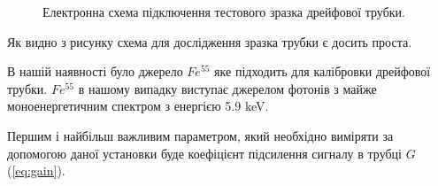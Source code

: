 \documentclass[pdftex,14pt]{scrartcl}
\begin{document}
\begin{spacing}{1.5}
\begin{figure}[!h]
	\caption{Електронна схема підключення тестового зразка дрейфової трубки.}
	\label{fig:electricCircuit}	
	\end{figure}
	
	
	
	
	
	
	
	Як видно з рисунку схема для дослідження зразка трубки є досить проста.
	
	В нашій наявності було джерело $Fe^{55}$  яке підходить для калібровки дрейфової трубки. $Fe^{55}$ в нашому випадку виступає джерелом фотонів з майже моноенергетичним спектром з енергією 5.9 keV.
	
	Першим і найбільш важливим параметром, який необхідно виміряти за допомогою даної установки буде коефіцієнт підсилення сигналу в трубці $G$ (\ref{eq:gain}).
	

\end{spacing}
\end{document}
